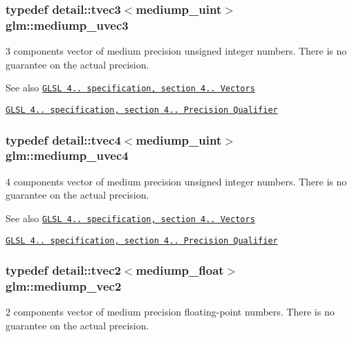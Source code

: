 \subsubsection[{mediump\+\_\+uvec3}]{\setlength{\rightskip}{0pt plus 5cm}typedef detail\+::tvec3$<$mediump\+\_\+uint$>$ {\bf glm\+::mediump\+\_\+uvec3}}\label{group__core__precision_gaa69cb8ff23d5c3daa3cf320136ac8e7d}
3 components vector of medium precision unsigned integer numbers. There is no guarantee on the actual precision.

\begin{DoxySeeAlso}{See also}
\href{http://www.opengl.org/registry/doc/GLSLangSpec.4.20.8.pdf}{\tt G\+L\+S\+L 4.. specification, section 4.. Vectors} 

\href{http://www.opengl.org/registry/doc/GLSLangSpec.4.20.8.pdf}{\tt G\+L\+S\+L 4.. specification, section 4.. Precision Qualifier} 
\end{DoxySeeAlso}
\hypertarget{group__core__precision_ga50b1bc4e07de623f15ec5a319c85609f}{}
\subsubsection[{mediump\+\_\+uvec4}]{\setlength{\rightskip}{0pt plus 5cm}typedef detail\+::tvec4$<$mediump\+\_\+uint$>$ {\bf glm\+::mediump\+\_\+uvec4}}\label{group__core__precision_ga50b1bc4e07de623f15ec5a319c85609f}
4 components vector of medium precision unsigned integer numbers. There is no guarantee on the actual precision.

\begin{DoxySeeAlso}{See also}
\href{http://www.opengl.org/registry/doc/GLSLangSpec.4.20.8.pdf}{\tt G\+L\+S\+L 4.. specification, section 4.. Vectors} 

\href{http://www.opengl.org/registry/doc/GLSLangSpec.4.20.8.pdf}{\tt G\+L\+S\+L 4.. specification, section 4.. Precision Qualifier} 
\end{DoxySeeAlso}
\hypertarget{group__core__precision_gaa19e624188c7908ba28b9ef829e076f2}{}
\subsubsection[{mediump\+\_\+vec2}]{\setlength{\rightskip}{0pt plus 5cm}typedef detail\+::tvec2$<$mediump\+\_\+float$>$ {\bf glm\+::mediump\+\_\+vec2}}\label{group__core__precision_gaa19e624188c7908ba28b9ef829e076f2}
2 components vector of medium precision floating-\/point numbers. There is no guarantee on the actual precision.

